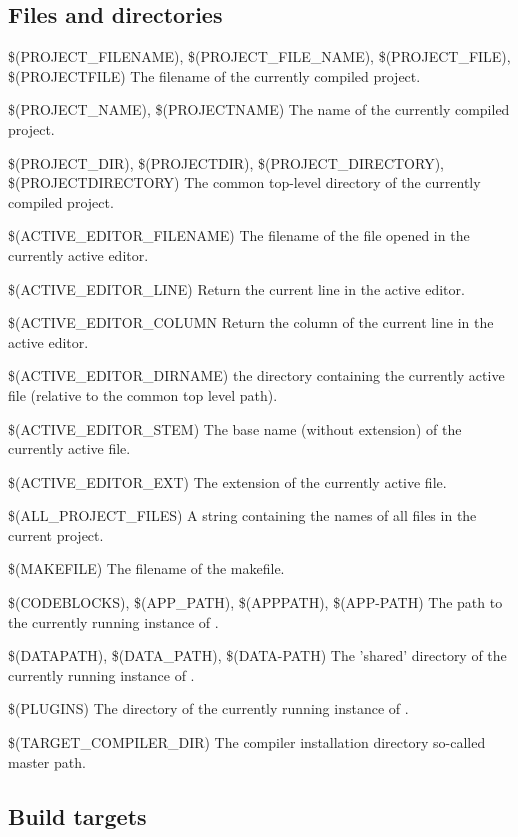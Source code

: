 \subsection{Files and directories}

\begin{codeentry}
\item[\$(PROJECT\_FILENAME), \$(PROJECT\_FILE\_NAME), \$(PROJECT\_FILE), \$(PROJECTFILE)] The filename of the currently compiled project.
\item[\$(PROJECT\_NAME), \$(PROJECTNAME)] The name of the currently compiled project.
\item[\$(PROJECT\_DIR), \$(PROJECTDIR), \$(PROJECT\_DIRECTORY), \$(PROJECTDIRECTORY)] The common top-level directory of the currently compiled project.
\item[\$(ACTIVE\_EDITOR\_FILENAME)] The filename of the file opened in the currently active editor.
\item[\$(ACTIVE\_EDITOR\_LINE)] Return the current line in the active editor.
\item[\$(ACTIVE\_EDITOR\_COLUMN] Return the column of the current line in the active editor.
\item[\$(ACTIVE\_EDITOR\_DIRNAME)] the directory containing the currently active file (relative to the common top level path).
\item[\$(ACTIVE\_EDITOR\_STEM)] The base name (without extension) of the currently active file.
\item[\$(ACTIVE\_EDITOR\_EXT)] The extension of the currently active file.
\item[\$(ALL\_PROJECT\_FILES)] A string containing the names of all files in the current project.
\item[\$(MAKEFILE)] The filename of the makefile.
\item[\$(CODEBLOCKS), \$(APP\_PATH), \$(APPPATH), \$(APP-PATH)] The path to the currently running instance of \codeblocks.
\item[\$(DATAPATH), \$(DATA\_PATH), \$(DATA-PATH)] The 'shared' directory of the currently running instance of \codeblocks.
\item[\$(PLUGINS)] The  directory of the currently running instance of \codeblocks.
\item[\$(TARGET\_COMPILER\_DIR)] The compiler installation directory so-called master path.
\end{codeentry}

\subsection{Build targets}

